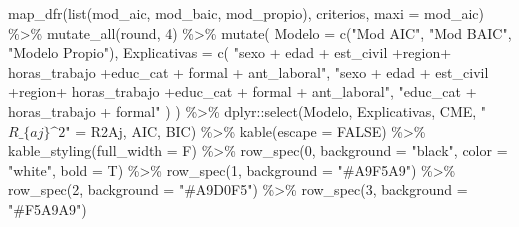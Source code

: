 \documentclass[
  spanish,
  letterpaper,
  DIV=11,
  numbers=noendperiod]{scrartcl}
\newenvironment{Shaded}{\begin{snugshade}}{\end{snugshade}}
\newcommand{\AttributeTok}[1]{\textcolor[rgb]{0.40,0.45,0.13}{#1}}
\newcommand{\ConstantTok}[1]{\textcolor[rgb]{0.56,0.35,0.01}{#1}}
\newcommand{\DecValTok}[1]{\textcolor[rgb]{0.68,0.00,0.00}{#1}}
\newcommand{\FunctionTok}[1]{\textcolor[rgb]{0.28,0.35,0.67}{#1}}
\newcommand{\NormalTok}[1]{\textcolor[rgb]{0.00,0.23,0.31}{#1}}
\newcommand{\OtherTok}[1]{\textcolor[rgb]{0.00,0.23,0.31}{#1}}
\newcommand{\SpecialCharTok}[1]{\textcolor[rgb]{0.37,0.37,0.37}{#1}}
\newcommand{\StringTok}[1]{\textcolor[rgb]{0.13,0.47,0.30}{#1}}
\begin{document}
\begin{Shaded}
\begin{Highlighting}[]
\FunctionTok{map\_dfr}\NormalTok{(}\FunctionTok{list}\NormalTok{(mod\_aic, mod\_baic, mod\_propio), criterios, }\AttributeTok{maxi =}\NormalTok{ mod\_aic) }\SpecialCharTok{\%\textgreater{}\%} 
  \FunctionTok{mutate\_all}\NormalTok{(round, }\DecValTok{4}\NormalTok{) }\SpecialCharTok{\%\textgreater{}\%} 
  \FunctionTok{mutate}\NormalTok{(}
    \AttributeTok{Modelo =} \FunctionTok{c}\NormalTok{(}\StringTok{"Mod AIC"}\NormalTok{, }\StringTok{"Mod BAIC"}\NormalTok{, }\StringTok{"Modelo Propio"}\NormalTok{),}
    \AttributeTok{Explicativas =} \FunctionTok{c}\NormalTok{(}
      \StringTok{"sexo + edad + est\_civil +region+ horas\_trabajo +educ\_cat + formal + ant\_laboral"}\NormalTok{,}
      \StringTok{"sexo + edad + est\_civil +region+ horas\_trabajo +educ\_cat + formal + ant\_laboral"}\NormalTok{,}
      \StringTok{"educ\_cat + horas\_trabajo + formal"}
\NormalTok{    )}
\NormalTok{  ) }\SpecialCharTok{\%\textgreater{}\%} 
\NormalTok{  dplyr}\SpecialCharTok{::}\FunctionTok{select}\NormalTok{(Modelo, Explicativas, CME, }\StringTok{"$R\_\{aj\}\^{}2$"} \OtherTok{=}\NormalTok{ R2Aj, AIC, BIC) }\SpecialCharTok{\%\textgreater{}\%} 
  \FunctionTok{kable}\NormalTok{(}\AttributeTok{escape =} \ConstantTok{FALSE}\NormalTok{) }\SpecialCharTok{\%\textgreater{}\%} 
  \FunctionTok{kable\_styling}\NormalTok{(}\AttributeTok{full\_width =}\NormalTok{ F) }\SpecialCharTok{\%\textgreater{}\%} 
  \FunctionTok{row\_spec}\NormalTok{(}\DecValTok{0}\NormalTok{, }\AttributeTok{background =} \StringTok{"black"}\NormalTok{, }\AttributeTok{color =} \StringTok{"white"}\NormalTok{, }\AttributeTok{bold =}\NormalTok{ T) }\SpecialCharTok{\%\textgreater{}\%} 
  \FunctionTok{row\_spec}\NormalTok{(}\DecValTok{1}\NormalTok{, }\AttributeTok{background =} \StringTok{"\#A9F5A9"}\NormalTok{) }\SpecialCharTok{\%\textgreater{}\%} 
  \FunctionTok{row\_spec}\NormalTok{(}\DecValTok{2}\NormalTok{, }\AttributeTok{background =} \StringTok{"\#A9D0F5"}\NormalTok{) }\SpecialCharTok{\%\textgreater{}\%} 
  \FunctionTok{row\_spec}\NormalTok{(}\DecValTok{3}\NormalTok{, }\AttributeTok{background =} \StringTok{"\#F5A9A9"}\NormalTok{)}
\end{Highlighting}
\end{Shaded}
\end{document}
